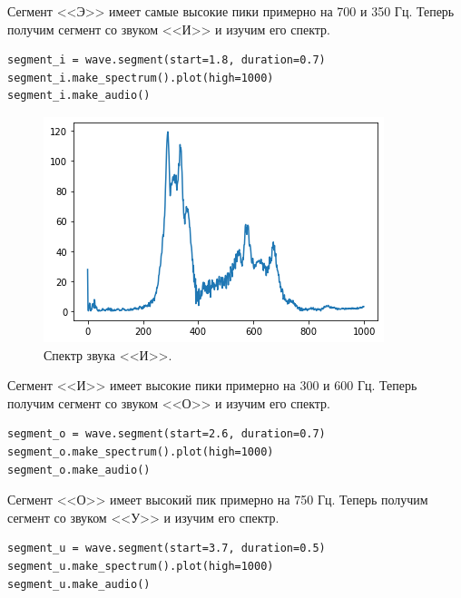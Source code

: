 \documentclass[a4paper, 14pt]{extarticle}
\begin{document}
    Сегмент <<Э>> имеет самые высокие пики примерно на 700 и 350 Гц.
    Теперь получим сегмент со звуком <<И>> и изучим его спектр.

    \begin{lstlisting}[caption= Вывод спектра звука <<И>>., label={lst:task5_segment_i}]
segment_i = wave.segment(start=1.8, duration=0.7)
segment_i.make_spectrum().plot(high=1000)
segment_i.make_audio()
    \end{lstlisting}

    \begin{figure}[h]
        \centering
        \includegraphics[width=0.7\linewidth]{resources/Images/task6_spectrum_i}
        \caption{Спектр звука <<И>>.}
        \label{fig:task6_spectrum_i}
    \end{figure}

    Сегмент <<И>> имеет высокие пики примерно на 300 и 600 Гц.
    Теперь получим сегмент со звуком <<О>> и изучим его спектр.

    \begin{lstlisting}[caption= Вывод спектра звука <<О>>., label={lst:task5_segment_o}]
segment_o = wave.segment(start=2.6, duration=0.7)
segment_o.make_spectrum().plot(high=1000)
segment_o.make_audio()
    \end{lstlisting}

    Сегмент <<О>> имеет высокий пик примерно на 750 Гц.
    Теперь получим сегмент со звуком <<У>> и изучим его спектр.

    \begin{lstlisting}[caption= Вывод спектра звука <<У>>., label={lst:task5_segment_u}]
segment_u = wave.segment(start=3.7, duration=0.5)
segment_u.make_spectrum().plot(high=1000)
segment_u.make_audio()
    \end{lstlisting}
\end{document}
